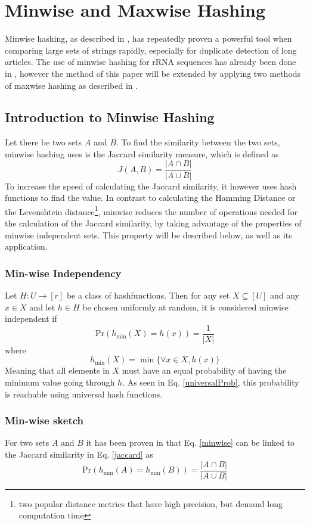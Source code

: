 \documentclass[../../main.tex]{subfiles}
\begin{document}
\section{Minwise and Maxwise Hashing}
Minwise hashing, as described in \cite{MinwiseIndependent}, has repeatedly proven a powerful tool when comparing large sets of strings rapidly, especially for duplicate detection of long articles. The use of minwise hashing for rRNA sequences has already been done in \cite{MinhashMapreduce}, however the method of this paper will be extended by applying two methods of maxwise hashing as described in \cite{minmaxhash}.
\subsection{Introduction to Minwise Hashing}
Let there be two sets $A$ and $B$. To find the similarity between the two sets, minwise hashing uses is the Jaccard similarity measure, which is defined as
\begin{equation}\label{jaccard}
J(A,B)=\frac{|A\cap B|}{|A\cup B|}
\end{equation}
To increase the speed of calculating the Jaccard similarity, it however uses hash functions to find the value. In contrast to calculating the Hamming Distance or the Levenshtein distance\footnote{two popular distance metrics that have high precision, but demand long computation time}, minwise reduces the number of operations needed for the calculation of the Jaccard similarity, by taking advantage of the properties of minwise independent sets\cite[pp. 3]{MinwiseIndependent}. This property will be described below, as well as its application.
\subsubsection{Min-wise Independency}
Let $H: U \rightarrow [r]$ be a class of hashfunctions. Then for any set $X\subseteq [U]$ and any $x \in X$ and let $h\in H$ be chosen uniformly at random, it is considered minwise independent if
\begin{equation}\label{minwise}
\mathrm{Pr}(h_{\min}(X)=h(x))=\frac{1}{|X|}
\end{equation}
where
$$
h_{\min}(X) = \min\{\forall x \in X, h(x)\} 
$$
Meaning that all elements in $X$ must have an equal probability of having the minimum value going through $h$. As seen in Eq. \ref{universalProb}, this probability is reachable using universal hash functions.

\subsubsection{Min-wise sketch}
For two sets $A$ and $B$ it has been proven in \cite{protominwise} that Eq. \ref{minwise} can be linked to the Jaccard similarity in Eq. \ref{jaccard} as
\begin{equation}\label{minwisejaccard}
\mathrm{Pr}(h_{\min}(A)=h_{\min}(B))=\frac{|A\cap B|}{|A\cup B|}
\end{equation}
\end{document}
